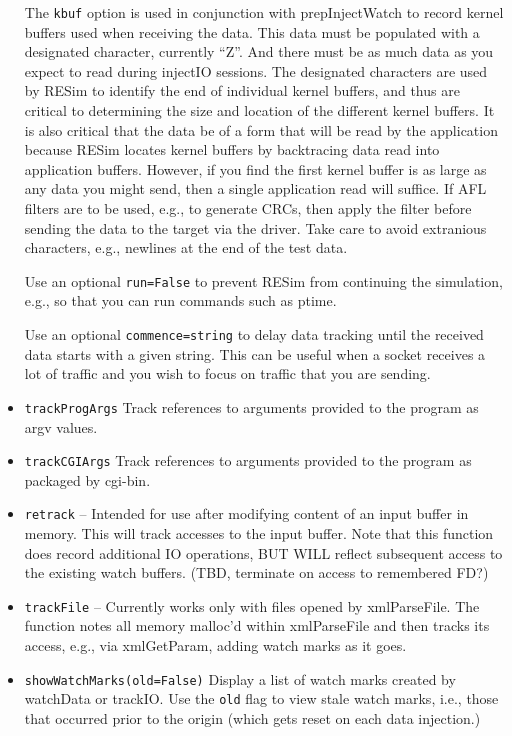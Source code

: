 \documentclass[titlepage]{article}
\begin{document}
\begin{itemize}
The {\tt kbuf} option is used in conjunction with prepInjectWatch to record kernel buffers used when receiving the data.  This data must be populated with 
a designated character, currently ``Z''.  And there must be as much data as you expect to read during injectIO sessions.  The designated characters are used by
RESim to identify the end of individual kernel buffers, and thus are critical to determining the size and location of the different kernel buffers.  It is also
critical that the data be of a form that will be read by the application because RESim locates kernel buffers by backtracing data read into application buffers.
However, if you find the first kernel buffer is as large as any data you might send, then a single application read will suffice.
If AFL filters are to be used, e.g., to generate CRCs, then apply the filter before sending the data to the target via the driver.
Take care to avoid extranious characters, e.g., newlines at the end of the test data.

Use an optional {\tt run=False} to prevent RESim from continuing the simulation, e.g., so that you can run commands such as ptime.

Use an optional {\tt commence=string} to delay data tracking until the received data starts with a given string.  This can be useful when a socket receives a lot of traffic and you
wish to focus on traffic that you are sending.

\item {\tt trackProgArgs} Track references to arguments provided to the program as argv values.

\item {\tt trackCGIArgs} Track references to arguments provided to the program as packaged by cgi-bin.

\item {\tt retrack} -- Intended for use after modifying content of an input buffer in memory.  This will track accesses to the input buffer.
Note that this function does record additional IO operations, BUT WILL reflect subsequent access to the existing watch buffers.  (TBD, terminate on access
to remembered FD?)

\item {\tt trackFile} -- Currently works only with files opened by xmlParseFile. The function notes all memory malloc'd within
xmlParseFile and then tracks its access, e.g., via xmlGetParam, adding watch marks as it goes.

\item {\tt showWatchMarks(old=False)} Display a list of watch marks created by watchData or trackIO.  Use the {\tt old} flag to view stale watch marks, i.e., 
those that occurred prior to the origin (which gets reset on each data injection.)


\end{itemize}
\end{document}
